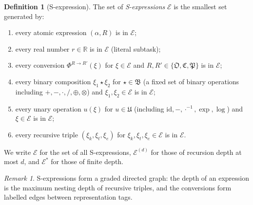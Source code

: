 \documentclass[11pt,a4paper]{article}
\theoremstyle{thmstyle}
\theoremstyle{thmstyle}
\theoremstyle{definition}
\newtheorem{definition}[theorem]{Definition}
\theoremstyle{remark}
\newtheorem{remark}[theorem]{Remark}
\newcommand{\Real}{\mathbb{R}}
\newcommand{\Expr}{\mathcal{E}}
\begin{document}
\begin{definition}[S-expression]\label{def:s-expression}
The set of \emph{S-expressions} $\Expr$ is the smallest
set generated by:
\begin{enumerate}[nosep,label=(\arabic*)]
\item every atomic expression $(\alpha, R)$ is in $\Expr$;
\item every real number $r \in \Real$ is in $\Expr$
      (literal subtask);
\item every conversion $\Phi^{R \to R'}(\xi)$ for $\xi
      \in \Expr$ and $R, R' \in \{\mathfrak{O},
      \mathfrak{C}, \mathfrak{P}\}$ is in $\Expr$;
\item every binary composition $\xi_{1} \star \xi_{2}$
      for $\star \in \mathfrak{B}$ (a fixed set of
      binary operations including $+, -, \cdot, /,
      \oplus, \otimes$) and $\xi_{1}, \xi_{2} \in
      \Expr$ is in $\Expr$;
\item every unary operation $u(\xi)$ for $u \in
      \mathfrak{U}$ (including
      $\mathrm{id}, -, \cdot^{-1}, \exp, \log$) and
      $\xi \in \Expr$ is in $\Expr$;
\item every recursive triple $(\xi_{k}, \xi_{t},
      \xi_{e})$ for $\xi_{k}, \xi_{t}, \xi_{e} \in
      \Expr$ is in $\Expr$.
\end{enumerate}
We write $\Expr$ for the set of all S-expressions,
$\Expr^{(d)}$ for those of recursion depth at most $d$,
and $\Expr^{*}$ for those of finite depth.
\end{definition}

\begin{remark}\label{rem:expression-graph}
S-expressions form a graded directed graph: the depth
of an expression is the maximum nesting depth of
recursive triples, and the conversions form labelled
edges between representation tags.
\end{remark}
\end{document}
